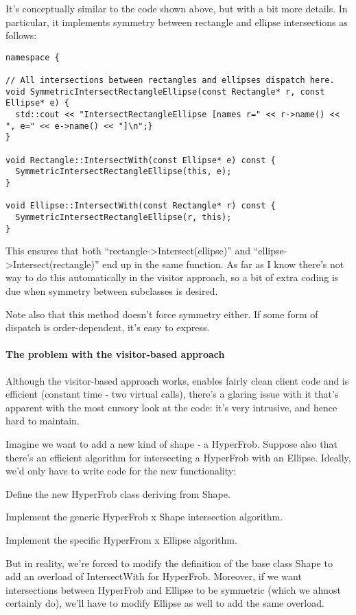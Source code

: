 \documentclass{book}
\begin{document}
It's conceptually similar to the code shown above, but with a bit more details. In particular, it implements symmetry between rectangle and ellipse intersections as follows:
\begin{lstlisting}
namespace {

// All intersections between rectangles and ellipses dispatch here.
void SymmetricIntersectRectangleEllipse(const Rectangle* r, const Ellipse* e) {
  std::cout << "IntersectRectangleEllipse [names r=" << r->name() << ", e=" << e->name() << "]\n";}
}

void Rectangle::IntersectWith(const Ellipse* e) const {
  SymmetricIntersectRectangleEllipse(this, e);
}

void Ellipse::IntersectWith(const Rectangle* r) const {
  SymmetricIntersectRectangleEllipse(r, this);
}
\end{lstlisting}
This ensures that both ``rectangle->Intersect(ellipse)'' and ``ellipse->Intersect(rectangle)'' end up in the same function.
As far as I know there's not way to do this automatically in the visitor approach, so a bit of extra coding is due when symmetry between subclasses is desired.

Note also that this method doesn't force symmetry either. If some form of dispatch is order-dependent, it's easy to express.
\paragraph{The problem with the visitor-based approach}

Although the visitor-based approach works, enables fairly clean client code and is efficient (constant time - two virtual calls),
there's a glaring issue with it that's apparent with the most cursory look at the code: it's very intrusive, and hence hard to maintain.

Imagine we want to add a new kind of shape - a HyperFrob. Suppose also that there's an efficient algorithm for intersecting a HyperFrob with an Ellipse.
Ideally, we'd only have to write code for the new functionality:

    Define the new HyperFrob class deriving from Shape.

    Implement the generic HyperFrob x Shape intersection algorithm.

    Implement the specific HyperFrom x Ellipse algorithm.

But in reality, we're forced to modify the definition of the base class Shape to add an overload of IntersectWith for HyperFrob.
Moreover, if we want intersections between HyperFrob and Ellipse to be symmetric (which we almost certainly do), we'll have to modify Ellipse as well to add the same overload.
\end{document}
